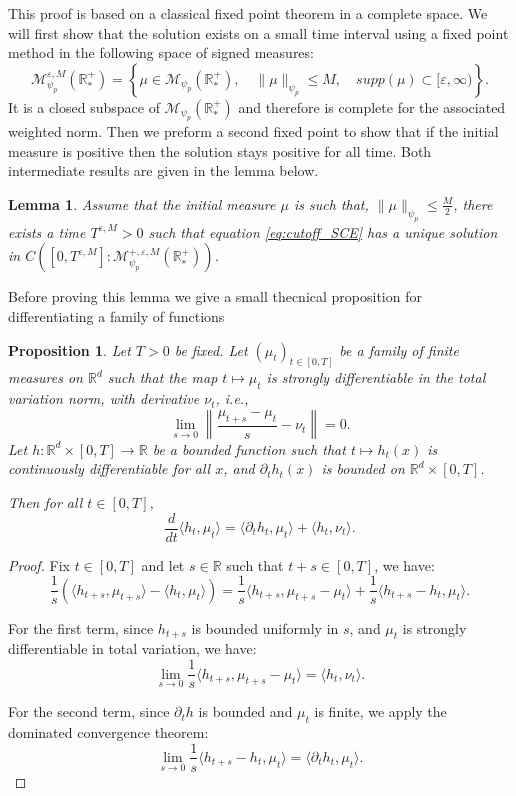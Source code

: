 \documentclass[11pt,a4paper]{article}
\newcommand{\RRP}{\mathbb{R}^+_*}
\newcommand{\MC}{\mathcal{M}}
\newtheorem{lemma}[theorem]{Lemma}
\newtheorem{proposition}[theorem]{Proposition}
\begin{document}
This proof is based on a classical fixed point theorem in a complete space. We will first show that the solution exists on a small time interval using a fixed point method in the following space of signed measures:
    \[ \MC^{\varepsilon,M}_{\psi_p}(\RRP) = \left\lbrace \mu \in \MC_{\psi_p}(\RRP) ,\quad \|\mu \|_{\psi_p}\leq M,\quad supp(\mu) \subset [\varepsilon,\infty)\right\rbrace. \]
It is a closed subspace of $\MC_{\psi_p}(\RRP)$ and therefore is complete for the associated weighted norm. Then we preform a second fixed point to show that if the initial measure is positive then the solution stays positive for all time. Both intermediate results are given in the lemma below. 
\begin{lemma}\label{lem:fixed-point-1}
    Assume that the initial measure $\mu$ is such that, $\| \mu\|_{\psi_p} \leq \frac{M}{2}$, there exists a time $T^{\varepsilon,M} > 0$ such that equation \eqref{eq:cutoff_SCE} has a unique solution in $C\left([0,T^{\varepsilon,M}]:\MC^{+,\varepsilon,M}_{\psi_p}(\RRP)\right)$. 
\end{lemma}
Before proving this lemma we give a small thecnical proposition for differentiating a family of functions
\begin{proposition}
    Let $T > 0$ be fixed. Let $\left(\mu_t \right)_{t \in [0,T]}$ be a family of finite measures on $\mathbb{R}^d$ such that the map $t \mapsto \mu_t$ is strongly differentiable in the total variation norm, with derivative $\nu_t$, i.e.,
    \[
    \lim_{s \to 0} \left\| \frac{\mu_{t+s} - \mu_t}{s} - \nu_t \right\| = 0.
    \]
    Let $h : \mathbb{R}^d \times [0,T] \to \mathbb{R}$ be a bounded function such that $t \mapsto h_t(x)$ is continuously differentiable for all $x$, and $\partial_t h_t(x)$ is bounded on $\mathbb{R}^d \times [0,T]$.
    
    Then for all $t \in [0,T]$,
    \[
    \frac{d}{dt} \langle h_t, \mu_t \rangle = \langle \partial_t h_t, \mu_t \rangle + \langle h_t, \nu_t \rangle.
    \]
    \end{proposition}
    
    \begin{proof}
    Fix $t \in [0,T]$ and let $s \in \mathbb{R}$ such that $t + s \in [0,T]$, we have:
    \[
    \frac{1}{s} \left( \langle h_{t+s}, \mu_{t+s} \rangle - \langle h_t, \mu_t \rangle \right) = \frac{1}{s} \langle h_{t+s}, \mu_{t+s} - \mu_t \rangle + \frac{1}{s} \langle h_{t+s} - h_t, \mu_t \rangle.
    \]
    
    For the first term, since $h_{t+s}$ is bounded uniformly in $s$, and $\mu_t$ is strongly differentiable in total variation, we have:
    \[
    \lim_{s \to 0} \frac{1}{s} \langle h_{t+s}, \mu_{t+s} - \mu_t \rangle = \langle h_t, \nu_t \rangle.
    \]
    
    For the second term, since $\partial_t h$ is bounded and $\mu_t$ is finite, we apply the dominated convergence theorem:
    \[
    \lim_{s \to 0} \frac{1}{s} \langle h_{t+s} - h_t, \mu_t \rangle = \langle \partial_t h_t, \mu_t \rangle.
    \]
    \end{proof}
    
\end{document}
